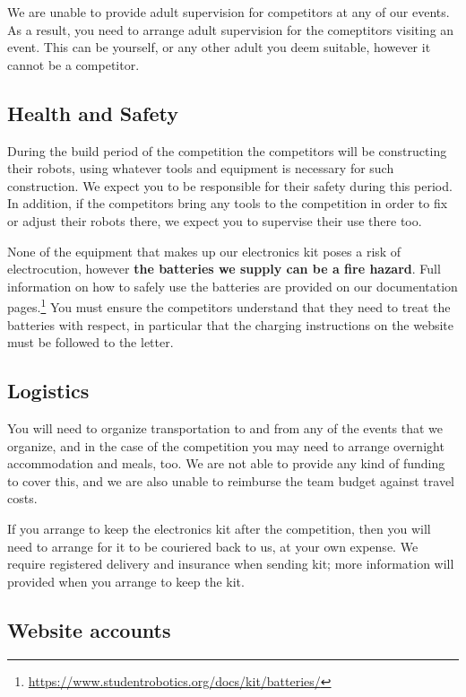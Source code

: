 \documentclass[a4paper]{article}
\begin{document}
We are unable to provide adult supervision for competitors at any of our
events. As a result, you need to arrange adult supervision for the comeptitors
visiting an event. This can be yourself, or any other adult you deem suitable,
however it cannot be a competitor.

\subsection*{Health and Safety}

During the build period of the competition the competitors will be constructing
their robots, using whatever tools and equipment is necessary for such
construction. We expect you to be responsible for their safety during this
period. In addition, if the competitors bring any tools to the competition in
order to fix or adjust their robots there, we expect you to supervise their use
there too.

None of the equipment that makes up our electronics kit poses a risk of
electrocution, however \textbf{the batteries we supply can be a fire hazard}.
Full information on how to safely use the batteries are provided on our
documentation
pages.\footnote{\url{https://www.studentrobotics.org/docs/kit/batteries/}}
You must ensure the competitors understand that they need to treat the
batteries with respect, in particular that the charging instructions on
the website must be followed to the letter.

\subsection*{Logistics}

You will need to organize transportation to and from any of the events that we
organize, and in the case of the competition you may need to arrange overnight
accommodation and meals, too. We are not able to provide any kind of funding to
cover this, and we are also unable to reimburse the team budget against travel
costs.

If you arrange to keep the electronics kit after the competition, then you will
need to arrange for it to be couriered back to us, at your own expense. We
require registered delivery and insurance when sending kit; more information
will provided when you arrange to keep the kit.

\subsection*{Website accounts}
\end{document}
